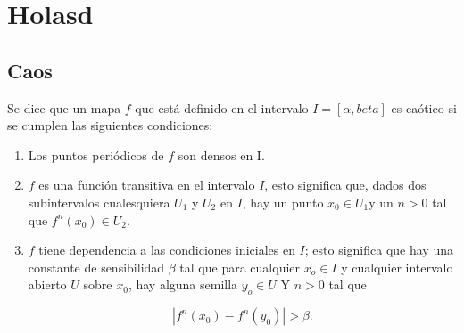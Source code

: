 \chapter{Holasd}

\section{Caos}

Se dice que un mapa $f$ que está definido en el intervalo $I= [\alpha, beta]$ es caótico si se cumplen las siguientes condiciones:

\begin{enumerate}
\item Los puntos periódicos de $f$ son densos en I.
\item $f$ es una función transitiva en el intervalo $I$, esto significa que, dados dos subintervalos cualesquiera $U_{1}$ y $U_{2}$ en $I$, hay un punto $x_{0} \in U_{1}$y un $n>0$ tal que $f^{n}(x_{0}) \in U_{2}$.
\item $f$ tiene dependencia  a las condiciones iniciales en $I$; esto significa que hay una constante de sensibilidad $\beta$ tal que para cualquier $x_{o} \in I$ y cualquier intervalo abierto $U$ sobre $x_{0}$, hay alguna semilla $y_{o} \in U$ Y $n >0$ tal que

\begin{equation}
|f^{n}(x_{0}) - f^{n}(y_{0}) | > \beta.
\end{equation} 
\end{enumerate}